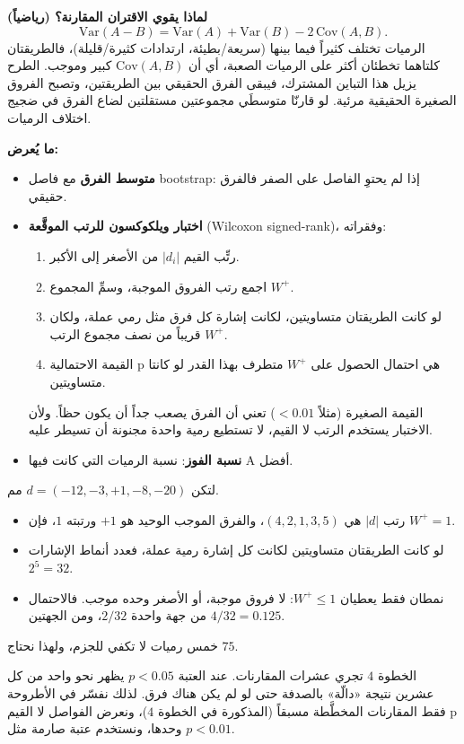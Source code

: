 \documentclass[11pt,a4paper]{article}
\newcommand{\en}[1]{\textenglish{#1}}
\begin{document}
\textbf{لماذا يقوي الاقتران المقارنة؟ (رياضياً)}
\[ \mathrm{Var}(A-B)=\mathrm{Var}(A)+\mathrm{Var}(B)-2\,\mathrm{Cov}(A,B). \]
الرميات تختلف كثيراً فيما بينها (سريعة/بطيئة، ارتدادات كثيرة/قليلة)، فالطريقتان كلتاهما تخطئان أكثر على الرميات الصعبة،
أي أن $\mathrm{Cov}(A,B)$ كبير وموجب. الطرح يزيل هذا التباين المشترك، فيبقى الفرق الحقيقي بين الطريقتين، وتصبح الفروق الصغيرة
الحقيقية مرئية. لو قارنّا متوسطَي مجموعتين مستقلتين لضاع الفرق في ضجيج اختلاف الرميات.

\textbf{ما يُعرض:}
\begin{itemize}
\item \textbf{متوسط الفرق} مع فاصل \en{bootstrap}: إذا لم يحتوِ الفاصل على الصفر فالفرق حقيقي.
\item \textbf{اختبار ويلكوكسون للرتب الموقَّعة} (\en{Wilcoxon signed-rank})، وفقراته:
\begin{enumerate}
\item رتِّب القيم $|d_i|$ من الأصغر إلى الأكبر.
\item اجمع رتب الفروق الموجبة، وسمِّ المجموع $W^+$.
\item لو كانت الطريقتان متساويتين، لكانت إشارة كل فرق مثل رمي عملة، ولكان $W^+$ قريباً من نصف مجموع الرتب.
\item القيمة الاحتمالية \en{p} هي احتمال الحصول على $W^+$ متطرف بهذا القدر لو كانتا متساويتين.
\end{enumerate}
القيمة الصغيرة (مثلاً $<0.01$) تعني أن الفرق يصعب جداً أن يكون حظاً. ولأن الاختبار يستخدم الرتب لا القيم، لا تستطيع رمية
واحدة مجنونة أن تسيطر عليه.
\item \textbf{نسبة الفوز}: نسبة الرميات التي كانت فيها \en{A} أفضل.
\end{itemize}

\begin{example}
لتكن $d=(-12,-3,+1,-8,-20)$ مم.
\begin{itemize}
\item رتب $|d|$ هي $(4,2,1,3,5)$، والفرق الموجب الوحيد هو $+1$ ورتبته $1$، فإن $W^+=1$.
\item لو كانت الطريقتان متساويتين لكانت كل إشارة رمية عملة، فعدد أنماط الإشارات $2^5=32$.
\item نمطان فقط يعطيان $W^+\le1$: لا فروق موجبة، أو الأصغر وحده موجب. فالاحتمال من جهة واحدة $2/32$، ومن الجهتين $4/32=0.125$.
\end{itemize}
خمس رميات لا تكفي للجزم، ولهذا نحتاج $75$.
\end{example}

\begin{warn}
الخطوة $4$ تجري عشرات المقارنات. عند العتبة $p<0.05$ يظهر نحو واحد من كل عشرين نتيجة «دالّة» بالصدفة حتى لو لم يكن هناك
فرق. لذلك نفسّر في الأطروحة فقط المقارنات المخطَّطة مسبقاً (المذكورة في الخطوة $4$)، ونعرض الفواصل لا القيم \en{p} وحدها،
ونستخدم عتبة صارمة مثل $p<0.01$.
\end{warn}
\end{document}
